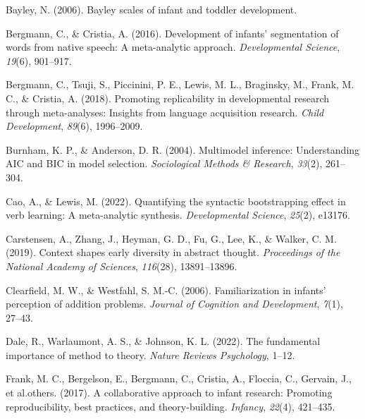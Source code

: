 \documentclass[10pt, letterpaper]{article}
\newenvironment{CSLReferences}%
  {}%
  {\par}
\begin{document}
\hypertarget{refs}{}
\begin{CSLReferences}{1}{0}
\leavevmode{}%
Bayley, N. (2006). Bayley scales of infant and toddler development.

\leavevmode{}%
Bergmann, C., \& Cristia, A. (2016). Development of infants'
segmentation of words from native speech: A meta-analytic approach.
\emph{Developmental Science}, \emph{19}(6), 901--917.

\leavevmode{}%
Bergmann, C., Tsuji, S., Piccinini, P. E., Lewis, M. L., Braginsky, M.,
Frank, M. C., \& Cristia, A. (2018). Promoting replicability in
developmental research through meta-analyses: Insights from language
acquisition research. \emph{Child Development}, \emph{89}(6),
1996--2009.

\leavevmode{}%
Burnham, K. P., \& Anderson, D. R. (2004). Multimodel inference:
Understanding AIC and BIC in model selection. \emph{Sociological Methods
\& Research}, \emph{33}(2), 261--304.

\leavevmode{}%
Cao, A., \& Lewis, M. (2022). Quantifying the syntactic bootstrapping
effect in verb learning: A meta-analytic synthesis. \emph{Developmental
Science}, \emph{25}(2), e13176.

\leavevmode{}%
Carstensen, A., Zhang, J., Heyman, G. D., Fu, G., Lee, K., \& Walker, C.
M. (2019). Context shapes early diversity in abstract thought.
\emph{Proceedings of the National Academy of Sciences}, \emph{116}(28),
13891--13896.

\leavevmode{}%
Clearfield, M. W., \& Westfahl, S. M.-C. (2006). Familiarization in
infants' perception of addition problems. \emph{Journal of Cognition and
Development}, \emph{7}(1), 27--43.

\leavevmode{}%
Dale, R., Warlaumont, A. S., \& Johnson, K. L. (2022). The fundamental
importance of method to theory. \emph{Nature Reviews Psychology}, 1--12.

\leavevmode{}%
Frank, M. C., Bergelson, E., Bergmann, C., Cristia, A., Floccia, C.,
Gervain, J., et al.others. (2017). A collaborative approach to infant
research: Promoting reproducibility, best practices, and
theory-building. \emph{Infancy}, \emph{22}(4), 421--435.


\end{CSLReferences}
\end{document}
